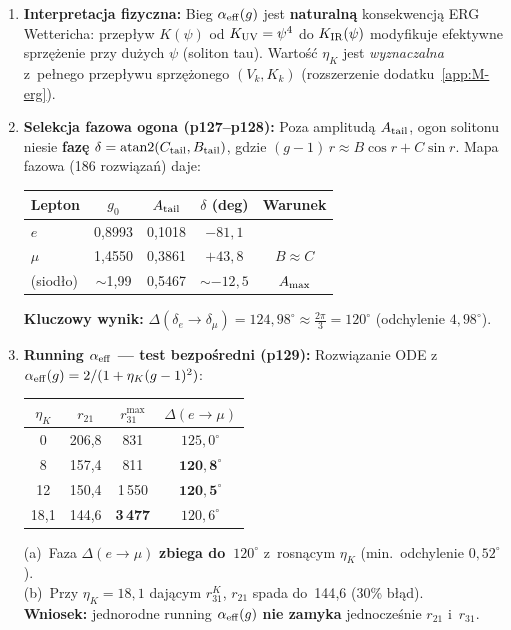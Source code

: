 \begin{enumerate}
  \item \textbf{Interpretacja fizyczna:}
    Bieg $\alpha_{\rm eff}(g)$ jest \textbf{naturaln\k{a}}
    konsekwencj\k{a} ERG Wettericha:
    przep\l{}yw $K(\psi)$ od $K_{\rm UV}=\psi^4$ do
    $K_{\rm IR}(\psi)$ modyfikuje efektywne sprz\k{e}\.zenie
    przy du\.zych $\psi$ (soliton tau).
    Warto\'s\'c $\eta_K$ jest \emph{wyznaczalna} z~pe\l{}nego
    przep\l{}ywu sprz\k{e}\.zonego $(V_k, K_k)$
    (rozszerzenie dodatku~\ref{app:M-erg}).

  \item \textbf{Selekcja fazowa ogona (p127--p128):}
    Poza amplitud\k{a} $A_{\rm tail}$, ogon solitonu niesie
    \textbf{faz\k{e}} $\delta = \operatorname{atan2}(C_{\rm tail}, B_{\rm tail})$,
    gdzie $(g-1)\,r \approx B\cos r + C\sin r$.
    Mapa fazowa (186 rozwi\k{a}za\'n) daje:
    \begin{center}\small
    \begin{tabular}{lcccc}
    \toprule
    Lepton & $g_0$ & $A_{\rm tail}$ & $\delta$ (deg) & Warunek \\
    \midrule
    $e$       & 0{,}8993 & 0{,}1018 & $-81{,}1$ & \\
    $\mu$     & 1{,}4550 & 0{,}3861 & $+43{,}8$ & $B \approx C$ \\
    (siod\l{}o) & $\sim$1{,}99 & 0{,}5467 & $\sim-12{,}5$ & $A_{\rm max}$ \\
    \bottomrule
    \end{tabular}
    \end{center}
    \textbf{Kluczowy wynik:}
    $\Delta(\delta_e \to \delta_\mu) = 124{,}98^\circ
     \approx \tfrac{2\pi}{3} = 120^\circ$
    (odchylenie $4{,}98^\circ$).

  \item \textbf{Running $\alpha_{\rm eff}$ --- test bezpo\'sredni (p129):}
    Rozwi\k{a}zanie ODE z~$\alpha_{\rm eff}(g) = 2/(1+\eta_K(g-1)^2)$:
    \begin{center}\small
    \begin{tabular}{cccc}
    \toprule
    $\eta_K$ & $r_{21}$ & $r_{31}^{\max}$ & $\Delta(e\to\mu)$ \\ \midrule
    0     & 206{,}8 & 831     & $125{,}0^\circ$ \\
    8     & 157{,}4 & 811     & $\mathbf{120{,}8^\circ}$ \\
    12    & 150{,}4 & 1\,550  & $\mathbf{120{,}5^\circ}$ \\
    18{,}1 & 144{,}6 & \textbf{3\,477}  & $120{,}6^\circ$ \\
    \bottomrule
    \end{tabular}
    \end{center}
    (a)~Faza $\Delta(e\to\mu)$ \textbf{zbiega do~$120^\circ$}
    z~rosn\k{a}cym $\eta_K$ (min.\ odchylenie $0{,}52^\circ$).\\
    (b)~Przy $\eta_K=18{,}1$ daj\k{a}cym $r_{31}^K$,
    $r_{21}$ spada do~144{,}6 (30\% b\l{}\k{a}d).\\
    \textbf{Wniosek:} jednorodne running $\alpha_{\rm eff}(g)$
    \textbf{nie zamyka} jednocze\'snie $r_{21}$ i~$r_{31}$.


\end{enumerate}
